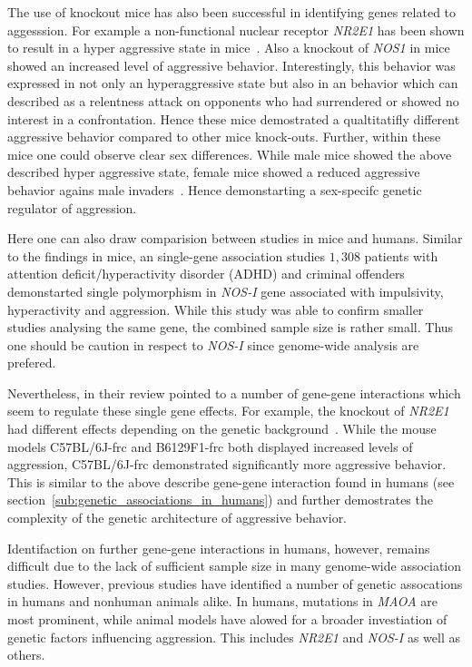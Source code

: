 The use of knockout mice has also been successful in identifying genes related to aggesssion.
For example a non-functional nuclear receptor \textit{NR2E1} has been shown to result in a hyper aggressive state in mice~\cite{Young2002}.
Also a knockout of \textit{NOS1} in mice showed an increased level of aggressive behavior.
Interestingly, this behavior was expressed in not only an hyperaggressive state but also in an behavior which can described as a relentness attack on opponents who had surrendered or showed no interest in a confrontation.
Hence these mice demostrated a qualtitatifly different aggressive behavior compared to other mice knock-outs.
Further, within these mice one could observe clear sex differences.
While male mice showed the above described hyper aggressive state, female mice showed a reduced aggressive behavior agains male invaders~\cite{Gammie1999,Nelson1995}.
Hence demonstarting a sex-specifc genetic regulator of aggression.

Here one can also draw comparision between studies in mice and humans.
Similar to the findings in mice, an single-gene association studies $1,308$ patients with attention deficit/hyperactivity disorder (ADHD) and criminal offenders demonstarted single polymorphism in \textit{NOS-I} gene associated with impulsivity, hyperactivity and aggression.
While this study was able to confirm smaller studies analysing the same gene, the combined sample size is rather small.
Thus one should be caution in respect to \textit{NOS-I} since genome-wide analysis are prefered.

Nevertheless, in their review \citet{Anholt2012} pointed to a number of gene-gene interactions which seem to regulate these single gene effects.
For example, the knockout of \textit{NR2E1} had different effects depending on the genetic background~\cite{Young2002}.
While the mouse models C57BL/6J-frc and B6129F1-frc both displayed increased levels of aggression, C57BL/6J-frc demonstrated significantly more aggressive behavior.
This is similar to the above describe gene-gene interaction found in humans (see section~\ref{sub:genetic_associations_in_humans}) and further demostrates the complexity of the genetic architecture of aggressive behavior.

Identifaction on further gene-gene interactions in humans, however, remains difficult due to the lack of sufficient sample size in many genome-wide association studies.
However, previous studies have identified a number of genetic assocations in humans and nonhuman animals alike.
In humans, mutations in \textit{MAOA} are most prominent, while animal models have alowed for a broader investiation of genetic factors influencing aggression.
This includes \textit{NR2E1} and \textit{NOS-I} as well as others.

